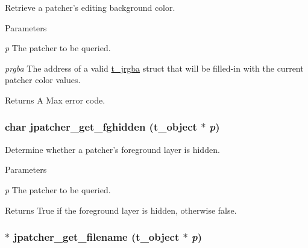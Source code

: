 Retrieve a patcher's editing background color. 
\begin{DoxyParams}{Parameters}
\item[{\em p}]The patcher to be queried. \item[{\em prgba}]The address of a valid \hyperlink{structt__jrgba}{t\_\-jrgba} struct that will be filled-\/in with the current patcher color values. \end{DoxyParams}
\begin{DoxyReturn}{Returns}
A Max error code. 
\end{DoxyReturn}
\hypertarget{group__jpatcher_ga164ac5db6109ab48fb0ca833263da801}{
\subsubsection[{jpatcher\_\-get\_\-fghidden}]{\setlength{\rightskip}{0pt plus 5cm}char jpatcher\_\-get\_\-fghidden ({\bf t\_\-object} $\ast$ {\em p})}}
\label{group__jpatcher_ga164ac5db6109ab48fb0ca833263da801}


Determine whether a patcher's foreground layer is hidden. 
\begin{DoxyParams}{Parameters}
\item[{\em p}]The patcher to be queried. \end{DoxyParams}
\begin{DoxyReturn}{Returns}
True if the foreground layer is hidden, otherwise false. 
\end{DoxyReturn}
\hypertarget{group__jpatcher_gaf8d1fda60ecc028f2aff88c81e8d4b4f}{
\subsubsection[{jpatcher\_\-get\_\-filename}]{$\ast$ jpatcher\_\-get\_\-filename ({\bf t\_\-object} $\ast$ {\em p})}}
\label{group__jpatcher_gaf8d1fda60ecc028f2aff88c81e8d4b4f}


